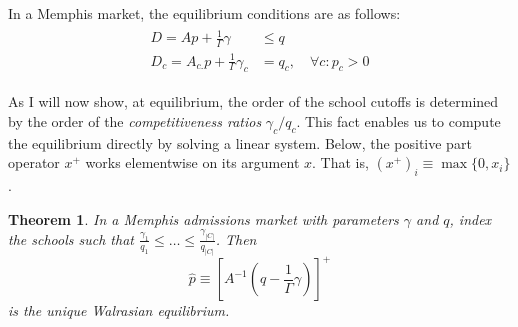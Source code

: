 \documentclass[12pt]{article}
\numberwithin{equation}{subsection}
\newtheorem{theorem}{Theorem}
\theoremstyle{definition}
\begin{document}
In a Memphis market, the equilibrium conditions are as follows:
\begin{gather} \label{ssmnleqconds}
\begin{aligned}
D = A p + \frac{1}{\Gamma}\gamma &\leq q \\
D_c = A_{c.} p + \frac{1}{\Gamma} \gamma_c &= q_c, \quad \forall c: p_c > 0
\end{aligned}
\end{gather}

As I will now show, at equilibrium, the order of the school cutoffs is determined by the order of the \emph{competitiveness ratios} $\gamma_c / q_c$. This fact enables us to compute the equilibrium directly by solving a linear system. Below, the positive part operator $x^+$ works elementwise on its argument $x$. That is, $(x^+)_i \equiv \max\{0, x_i\}$.

\begin{theorem} \label{cutoffsortationthm}
In a Memphis admissions market with parameters $\gamma$ and $q$, index the schools such that $\frac{\gamma_1}{q_1} \leq \dots \leq \frac{\gamma_{|C|}}{q_{|C|}}$. Then %
\[\hat p \equiv \left[A^{-1} (q - \frac{1}{\Gamma} \gamma) \right]^+\]
is the unique Walrasian equilibrium.
\end{theorem} 
\end{document}
